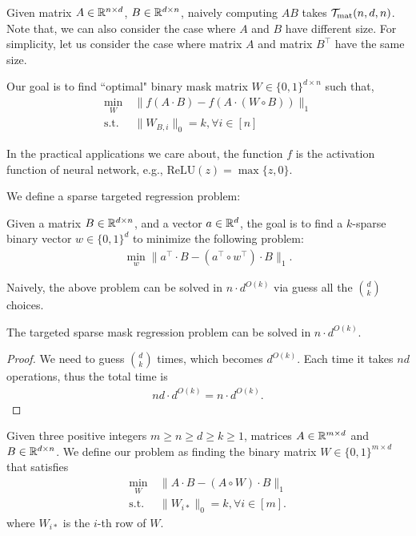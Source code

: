 Given matrix $A \in \mathbb{R}^{n \times d}$, $B \in \mathbb{R}^{d \times n}$, naively computing $AB$ takes ${\cal T}_{\mathrm{mat}}(n,d,n)$. Note that, we can also consider the case where $A$ and $B$ have different size. For simplicity, let us consider the case where matrix $A$ and matrix $B^\top$ have the same size.

Our goal is to find ``optimal" binary mask matrix $W \in \{0, 1\}^{d \times n}$ such that,
\begin{align*}
     \min_{W} & ~ \| f(A \cdot B) - f(A \cdot (W \circ B)) \|_1 \\
    \text{s.t.} & ~ \| W_{B,i} \|_0 = k , \forall i \in [n]
\end{align*}

\begin{remark}
In the practical applications we care about, the function $f$ is the activation function of neural network, e.g., $\mathrm{ReLU}(z) =\max\{z,0\}$.
\end{remark}



We define a sparse targeted regression problem:
\begin{definition}
Given a matrix $B \in \mathbb{R}^{d \times n}$, and a vector $a \in \mathbb{R}^d$, the goal is to find a $k$-sparse binary vector $w \in \{0,1\}^d$ to minimize the following problem:
\begin{align*}
    \min_{w} \| a^\top\cdot B - (a^\top \circ w^\top) \cdot B \|_1.
\end{align*}

\end{definition}

Naively, the above problem can be solved in $n \cdot d^{O(k)}$ via guess all the ${d \choose k}$ choices. 
\begin{lemma}\label{lem:mask_regreesion_vector}
The targeted sparse mask regression problem can be solved in $n \cdot d^{O(k)}$.
\end{lemma}
\begin{proof}
We need to guess ${d \choose k}$ times, which becomes $d^{O(k)}$. Each time it takes $n d$ operations, thus the total time is 
\begin{align*}
    nd \cdot d^{O(k)} = n \cdot d^{O(k)}.
\end{align*}
\end{proof}


\begin{definition}\label{def:sparse_mask_factorization_before}
Given three positive integers $m \geq n \geq d \geq k \geq 1$, matrices $A \in \mathbb{R}^{m \times d}$ and $B \in \mathbb{R}^{d\times n}$. We define our  problem as finding the binary matrix $W\in \{0, 1\}^{m \times d}$ that satisfies 
\begin{align*}
     \min_{W} & ~ \| A \cdot B - (A \circ W) \cdot B \|_1 \\
    \mathrm{s.t.} & ~ \| W_{i*} \|_0 = k , \forall i \in [m].
\end{align*}
where $W_{i*}$ is the $i$-th row of $W$.
\end{definition}

